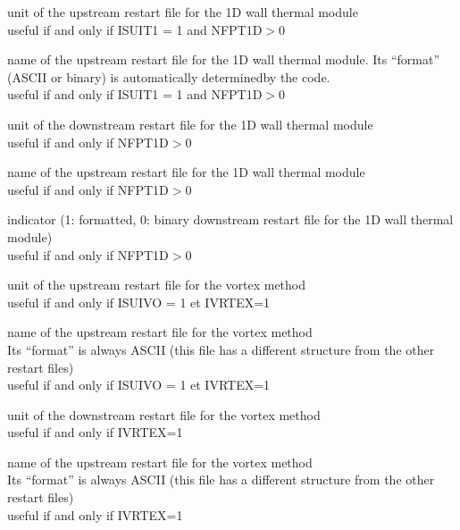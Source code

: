 
{unit of the upstream restart file for the 1D wall thermal module\\
useful if and only if ISUIT1 = 1 and NFPT1D$>$0}

{name of the upstream restart file for the 1D wall thermal module.
Its ``format'' (ASCII or binary) is  automatically determinedby the code.\\
useful if and only if ISUIT1 = 1 and NFPT1D$>$0}

{unit of the downstream restart file for the 1D wall thermal module\\
useful if and only if NFPT1D$>$0}

{name of the upstream restart file for the 1D wall thermal module\\
useful if and only if NFPT1D$>$0}

{indicator (1: formatted, 0: binary downstream restart file for the 1D wall thermal module)\\
useful if and only if NFPT1D$>$0}


{unit of the upstream restart file for the vortex method\\
useful if and only if ISUIVO = 1 et IVRTEX=1}

{name of the upstream restart file for the vortex method\\
Its ``format'' is always ASCII (this file has a different structure from the
other restart files)\\
useful if and only if ISUIVO = 1 et IVRTEX=1}

{unit of the downstream restart file for the vortex method\\
useful if and only if IVRTEX=1}

{name of the upstream restart file for the vortex method\\
Its ``format'' is always ASCII (this file has a different structure from the
other restart files)\\
useful if and only if IVRTEX=1}

